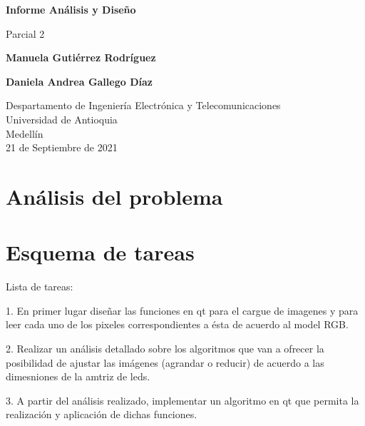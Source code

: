 \documentclass{article}
\begin{document}
\begin{titlepage}
    \begin{center}
        \vspace*{1cm}
            
        \Huge
        \textbf{Informe Análisis y Diseño}
            
        \vspace{0.5cm}
        \LARGE
        Parcial 2
            
        \vspace{1.5cm}
            
        \textbf{Manuela Gutiérrez Rodríguez}
        \vspace{0.5cm}
        
        \textbf{Daniela Andrea Gallego Díaz}
            
        \vfill
            
        \vspace{0.8cm}
            
        \Large
        Despartamento de Ingeniería Electrónica y Telecomunicaciones\\
        Universidad de Antioquia\\
        Medellín\\
        21 de Septiembre de 2021
            
    \end{center}
\end{titlepage}

\tableofcontents
\newpage
\section{Análisis del problema}\label{Analisis}



\section{Esquema de tareas} \label{Esquema}

Lista de tareas:

1. En primer lugar diseñar las funciones en qt para el cargue de imagenes y para leer cada uno de los pixeles correspondientes a ésta de acuerdo al model RGB.

2. Realizar un análisis detallado sobre los algoritmos que van a ofrecer la posibilidad de ajustar las imágenes (agrandar o reducir) de acuerdo a las dimesniones de la amtriz de leds.

3. A partir del análisis realizado, implementar un algoritmo en qt que permita la realización y aplicación de dichas funciones.
\end{document}

